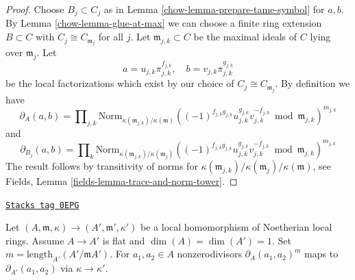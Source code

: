 \begin{proof}

Choose $B_j \subset C_j$ as in
Lemma \ref{chow-lemma-prepare-tame-symbol} for $a, b$.
By Lemma \ref{chow-lemma-glue-at-max} we can choose a finite ring
extension $B \subset C$ with $C_j \cong C_{\mathfrak m_j}$ for all $j$.
Let $\mathfrak m_{j, k} \subset C$ be the maximal ideals of $C$
lying over $\mathfrak m_j$. Let
$$
a = u_{j, k}\pi_{j, k}^{f_{j, k}},\quad
b = v_{j, k}\pi_{j, k}^{g_{j, k}}
$$
be the local factorizations which exist by our choice of
$C_j \cong C_{\mathfrak m_j}$. By definition we have
$$
\partial_A(a, b) =
\prod\nolimits_{j, k}
\text{Norm}_{\kappa(\mathfrak m_{j, k})/\kappa(\mathfrak m)}
((-1)^{f_{j, k}g_{j, k}}u_{j, k}^{g_{j, k}}v_{j, k}^{-f_{j, k}}
\bmod \mathfrak m_{j, k})^{m_{j, k}}
$$
and
$$
\partial_{B_j}(a, b) =
\prod\nolimits_k
\text{Norm}_{\kappa(\mathfrak m_{j, k})/\kappa(\mathfrak m_j)}
((-1)^{f_{j, k}g_{j, k}}u_{j, k}^{g_{j, k}}v_{j, k}^{-f_{j, k}}
\bmod \mathfrak m_{j, k})^{m_{j, k}}
$$
The result follows by transitivity of norms
for $\kappa(\mathfrak m_{j, k})/\kappa(\mathfrak m_j)/\kappa(\mathfrak m)$, see
Fields, Lemma \ref{fields-lemma-trace-and-norm-tower}.
\end{proof}

\begin{lemma}
\label{chow-lemma-tame-symbol-formally-smooth}
\href{https://stacks.math.columbia.edu/tag/0EPG}{\texttt{Stacks tag 0EPG}}

Let $(A, \mathfrak m, \kappa) \to (A', \mathfrak m', \kappa')$
be a local homomorphism of Noetherian local rings. Assume $A \to A'$
is flat and $\dim(A) = \dim(A') = 1$. Set
$m = \text{length}_{A'}(A'/\mathfrak mA')$.
For $a_1, a_2 \in A$ nonzerodivisors
$\partial_A(a_1, a_2)^m$ maps to $\partial_{A'}(a_1, a_2)$
via $\kappa \to \kappa'$.
\end{lemma}

